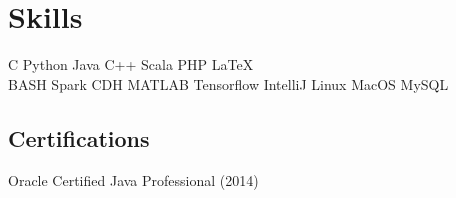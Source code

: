 \documentclass[hidelinks,letterpaper]{deedy-resume-openfont} %
\begin{document}
\begin{minipage}[t]{0.33\textwidth}
\section{Skills}

 C \textbullet{} Python \textbullet{} Java \textbullet{} C++ \textbullet{} Scala \textbullet{} PHP \textbullet{} \LaTeX\ \\ 
BASH\textbullet{} Spark \textbullet{} CDH \textbullet{} MATLAB \textbullet{} Tensorflow \textbullet{} IntelliJ \textbullet{} Linux \textbullet{} MacOS \textbullet{} MySQL    

\sectionsep %
\subsection{Certifications}
Oracle Certified Java Professional (2014)

\sectionsep %



\end{minipage} %
\hfill
%
%
\end{document}
